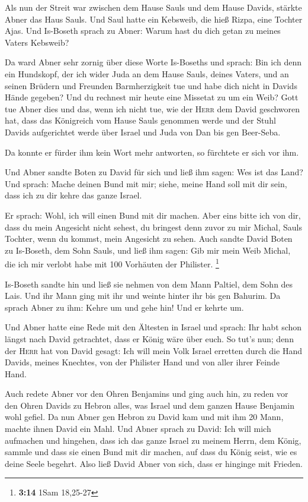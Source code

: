  Als nun der Streit war zwischen dem Hause Sauls und dem
Hause Davids, stärkte Abner das Haus Sauls.  Und Saul
hatte ein Kebsweib, die hieß Rizpa, eine Tochter Ajas. Und Is-Boseth
sprach zu Abner: Warum hast du dich getan zu meines Vaters Kebsweib?

 Da ward Abner sehr zornig über diese Worte Is-Boseths und
sprach: Bin ich denn ein Hundskopf, der ich wider Juda an dem Hause
Sauls, deines Vaters, und an seinen Brüdern und Freunden Barmherzigkeit
tue und habe dich nicht in Davids Hände gegeben? Und du rechnest mir
heute eine Missetat zu um ein Weib?  Gott tue Abner dies
und das, wenn ich nicht tue, wie der \textsc{Herr} dem David geschworen
hat,  dass das Königreich vom Hause Sauls genommen werde
und der Stuhl Davids aufgerichtet werde über Israel und Juda von Dan bis
gen Beer-Seba.

 Da konnte er fürder ihm kein Wort mehr antworten, so
fürchtete er sich vor ihm.

 Und Abner sandte Boten zu David für sich und ließ ihm
sagen: Wes ist das Land? Und sprach: Mache deinen Bund mit mir; siehe,
meine Hand soll mit dir sein, dass ich zu dir kehre das ganze Israel.

 Er sprach: Wohl, ich will einen Bund mit dir machen.
Aber eins bitte ich von dir, dass du mein Angesicht nicht sehest, du
bringest denn zuvor zu mir Michal, Sauls Tochter, wenn du kommst, mein
Angesicht zu sehen.  Auch sandte David Boten zu
Is-Boseth, dem Sohn Sauls, und ließ ihm sagen: Gib mir mein Weib Michal,
die ich mir verlobt habe mit 100 Vorhäuten der Philister. \footnote{\textbf{3:14}
  1Sam 18,25-27}

 Is-Boseth sandte hin und ließ sie nehmen von dem Mann
Paltiel, dem Sohn des Lais.  Und ihr Mann ging mit ihr
und weinte hinter ihr bis gen Bahurim. Da sprach Abner zu ihm: Kehre um
und gehe hin! Und er kehrte um.

 Und Abner hatte eine Rede mit den Ältesten in Israel und
sprach: Ihr habt schon längst nach David getrachtet, dass er König wäre
über euch.  So tut's nun; denn der \textsc{Herr} hat von
David gesagt: Ich will mein Volk Israel erretten durch die Hand Davids,
meines Knechtes, von der Philister Hand und von aller ihrer Feinde Hand.

 Auch redete Abner vor den Ohren Benjamins und ging auch
hin, zu reden vor den Ohren Davids zu Hebron alles, was Israel und dem
ganzen Hause Benjamin wohl gefiel.  Da nun Abner gen
Hebron zu David kam und mit ihm 20 Mann, machte ihnen David ein Mahl.
 Und Abner sprach zu David: Ich will mich aufmachen und
hingehen, dass ich das ganze Israel zu meinem Herrn, dem König, sammle
und dass sie einen Bund mit dir machen, auf dass du König seist, wie es
deine Seele begehrt. Also ließ David Abner von sich, dass er hinginge
mit Frieden.

